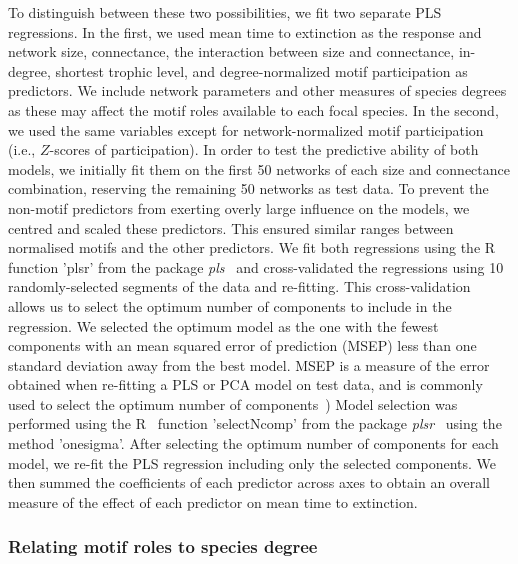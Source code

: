 \documentclass[12pt]{article}
\begin{document}
			
			To distinguish between these two possibilities, we fit two separate PLS regressions.
			In the first, we used mean time to extinction as the response and network size, connectance, the interaction between size and connectance, in-degree, shortest trophic level, and degree-normalized motif participation as predictors.
			We include network parameters and other measures of species degrees as these may affect the motif roles available to each focal species.
			In the second, we used the same variables except for network-normalized motif participation (i.e., $Z$-scores of participation).  
			In order to test the predictive ability of both models, we initially fit them on the first 50 networks of each size and connectance combination, reserving the remaining 50 networks as test data.
			To prevent the non-motif predictors from exerting overly large influence on the models, we centred and scaled these predictors. 
			This ensured similar ranges between normalised motifs and the other predictors.
			We fit both regressions using the R~\citep{R} function 'plsr' from the package \emph{pls}~\citep{pls} and cross-validated the regressions using 10 randomly-selected segments of the data and re-fitting.
			This cross-validation allows us to select the optimum number of components to include in the regression.
			We selected the optimum model as the one with the fewest components with an mean squared error of prediction (MSEP) less than one standard deviation away from the best model.
			MSEP is a measure of the error obtained when re-fitting a PLS or PCA model on test data, and is commonly used to select the optimum number of components~\citep{Mevik2004})
			Model selection was performed using the R~\citep{R} function 'selectNcomp' from the package \emph{plsr}~\citep{pls} using the method 'onesigma'.
			After selecting the optimum number of components for each model, we re-fit the PLS regression including only the selected components. 
			We then summed the coefficients of each predictor across axes to obtain an overall measure of the effect of each predictor on mean time to extinction.


		\subsubsection*{Relating motif roles to species degree}
\end{document}
